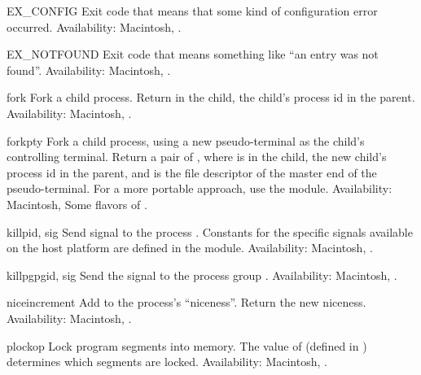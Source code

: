 \begin{datadesc}{EX_CONFIG}
Exit code that means that some kind of configuration error occurred.
Availability: Macintosh, \UNIX.
\end{datadesc}

\begin{datadesc}{EX_NOTFOUND}
Exit code that means something like ``an entry was not found''.
Availability: Macintosh, \UNIX.
\end{datadesc}

\begin{funcdesc}{fork}{}
Fork a child process.  Return  in the child, the child's
process id in the parent.
Availability: Macintosh, \UNIX.
\end{funcdesc}

\begin{funcdesc}{forkpty}{}
Fork a child process, using a new pseudo-terminal as the child's
controlling terminal. Return a pair of ,
where  is  in the child, the new child's process id
in the parent, and  is the file descriptor of the master end
of the pseudo-terminal.  For a more portable approach, use the
 module.
Availability: Macintosh, Some flavors of \UNIX.
\end{funcdesc}

\begin{funcdesc}{kill}{pid, sig}
Send signal  to the process .  Constants for the
specific signals available on the host platform are defined in the
 module.
Availability: Macintosh, \UNIX.
\end{funcdesc}

\begin{funcdesc}{killpg}{pgid, sig}
Send the signal  to the process group .
Availability: Macintosh, \UNIX.
\end{funcdesc}

\begin{funcdesc}{nice}{increment}
Add  to the process's ``niceness''.  Return the new
niceness.
Availability: Macintosh, \UNIX.
\end{funcdesc}

\begin{funcdesc}{plock}{op}
Lock program segments into memory.  The value of 
(defined in ) determines which segments are locked.
Availability: Macintosh, \UNIX.
\end{funcdesc}

